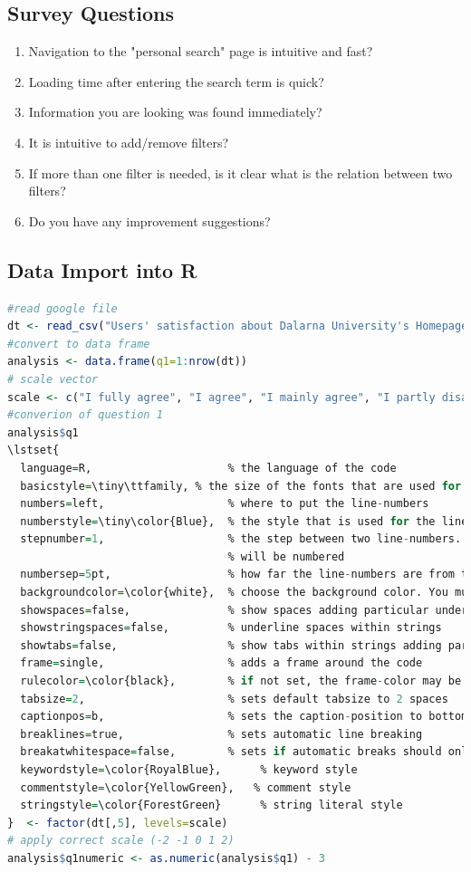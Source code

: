 \documentclass[12pt,a4paper,paper=a4,oneside,titlepage,pdftex]{scrartcl}
\begin{document}
\subsection{Survey Questions}
\begin{enumerate}
	\item Navigation to the "personal search" page is intuitive and fast?
	\item Loading time after entering the search term is quick? 
	\item Information you are looking was found immediately?
	\item It is intuitive to add/remove filters?
	\item If more than one filter is needed, is it clear what is the relation between two filters?
	\item Do you have any improvement suggestions?
\end{enumerate}

\subsection{Data Import into R}
\begin{lstlisting}[caption={Data Import into R},label={lst:r-import},language=R]
#read google file
dt <- read_csv("Users' satisfaction about Dalarna University's Homepage.csv")
#convert to data frame
analysis <- data.frame(q1=1:nrow(dt))
# scale vector
scale <- c("I fully agree", "I agree", "I mainly agree", "I partly disagree", "I disagree")
#converion of question 1
analysis$q1
\lstset{ 
  language=R,                     % the language of the code
  basicstyle=\tiny\ttfamily, % the size of the fonts that are used for the code
  numbers=left,                   % where to put the line-numbers
  numberstyle=\tiny\color{Blue},  % the style that is used for the line-numbers
  stepnumber=1,                   % the step between two line-numbers. If it is 1, each line
                                  % will be numbered
  numbersep=5pt,                  % how far the line-numbers are from the code
  backgroundcolor=\color{white},  % choose the background color. You must add \usepackage{color}
  showspaces=false,               % show spaces adding particular underscores
  showstringspaces=false,         % underline spaces within strings
  showtabs=false,                 % show tabs within strings adding particular underscores
  frame=single,                   % adds a frame around the code
  rulecolor=\color{black},        % if not set, the frame-color may be changed on line-breaks within not-black text (e.g. commens (green here))
  tabsize=2,                      % sets default tabsize to 2 spaces
  captionpos=b,                   % sets the caption-position to bottom
  breaklines=true,                % sets automatic line breaking
  breakatwhitespace=false,        % sets if automatic breaks should only happen at whitespace
  keywordstyle=\color{RoyalBlue},      % keyword style
  commentstyle=\color{YellowGreen},   % comment style
  stringstyle=\color{ForestGreen}      % string literal style
}  <- factor(dt[,5], levels=scale)
# apply correct scale (-2 -1 0 1 2)
analysis$q1numeric <- as.numeric(analysis$q1) - 3
\end{lstlisting}
\end{document}
